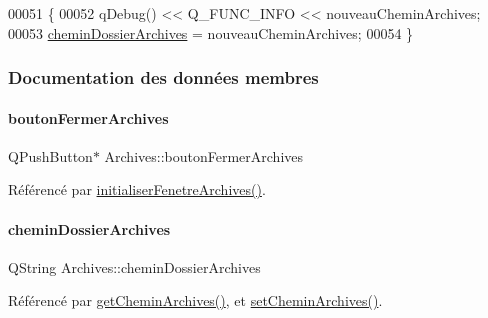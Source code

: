 \begin{DoxyCode}
00051 \{
00052     qDebug() << Q\_FUNC\_INFO << nouveauCheminArchives;
00053     \hyperlink{class_archives_af155e5062883030cddaa05623a34854b}{cheminDossierArchives} = nouveauCheminArchives;
00054 \}
\end{DoxyCode}


\subsubsection{Documentation des données membres}
\mbox{\label{class_archives_a598e607e203aee9386f85d55f20d8fda}} 
\paragraph{\texorpdfstring{bouton\+Fermer\+Archives}{boutonFermerArchives}}
{\footnotesize\ttfamily Q\+Push\+Button$\ast$ Archives\+::bouton\+Fermer\+Archives\hspace{0.3cm}{\ttfamily [private]}}



Référencé par \hyperlink{class_archives_a1842ebad3721929949bc07be5144b79c}{initialiser\+Fenetre\+Archives()}.

\mbox{\label{class_archives_af155e5062883030cddaa05623a34854b}} 
\paragraph{\texorpdfstring{chemin\+Dossier\+Archives}{cheminDossierArchives}}
{\footnotesize\ttfamily Q\+String Archives\+::chemin\+Dossier\+Archives\hspace{0.3cm}{\ttfamily [private]}}



Référencé par \hyperlink{class_archives_a65dfbaba0123e6530b03bfb70e614c90}{get\+Chemin\+Archives()}, et \hyperlink{class_archives_a899e95a34c2a6f79b9a25355b5bf9cb6}{set\+Chemin\+Archives()}.

\mbox{\label{class_archives_a2b268dd292da50166988ad698af2b0fd}} 

